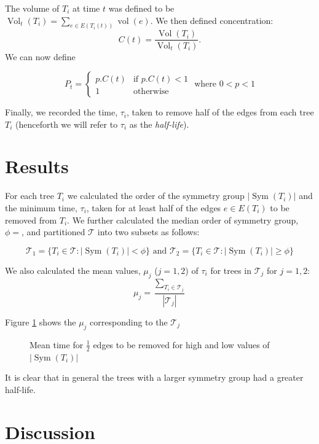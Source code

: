 \documentclass[10pt]{amsart} %
\theoremstyle{definition}
\DeclareMathOperator{\vol}{vol}
\DeclareMathOperator{\Vol}{Vol}
\DeclareMathOperator{\Sym}{Sym}
\begin{document}
The volume of $T_i$ at time $t$ was defined to be $\Vol_{t}(T_i) = \sum_{e \in E(T_i(t))} \vol(e)$.  We then defined concentration: 
\[C(t) = \frac{\Vol(T_i)}{\Vol_{t}(T_i)}.\]
We can now define %

\[P_t = \begin{cases} p.C(t) &\mbox{if } p.C(t) <1 \\
1 & \mbox{otherwise }  \end{cases} \text{       where   } 0<p<1 \]

Finally, we recorded the time, $\tau_{i}$, taken to remove half of the edges from each tree $T_{i}$ (henceforth we will refer to $\tau_i$ as the \emph{half-life}). 
 
\section{Results}  

For each tree $T_i$ we calculated the order of the symmetry group $\lvert\Sym(T_i)\rvert$ and the minimum time, $\tau_i$, taken for at least half of the edges $e \in E(T_i)$  to be removed from $T_i$.  We further calculated the median order of symmetry group, $\phi = $, and partitioned $\mathcal{T}$ into two subsets as follows: 

\[\mathcal{T}_{1} = \{T_i \in \mathcal{T} : \lvert\Sym(T_i)\rvert < \phi\} \text{      and      }\mathcal{T}_{2} = \{T_i \in \mathcal{T} : \lvert\Sym(T_i)\rvert \geq \phi\} \]
 
We also calculated the mean values, $\mu_j$ ($j = 1,2$) of $\tau_i$ for trees in $\mathcal{T}_j$ for $j = 1,2$:
\[\mu_j = \frac{\sum_{T_i \in \mathcal{T}_j}}{|\mathcal{T}_j|}\]

Figure \ref{t12} shows the $\mu_j$ corresponding to the $\mathcal{T}_j$

\begin{figure}[H]

              \centering
                \caption{Mean time for $\frac{1}{2}$ edges to be removed for high and low values of $|\Sym(T_i)|$}\label{t12}
\end{figure}

It is clear that in general the trees with a larger symmetry group had a greater half-life.

\section{Discussion}
\end{document}
